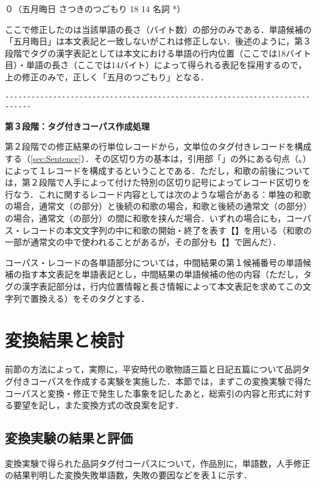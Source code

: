 ０（五月晦日 さつきのつごもり 18 14 名詞 *）

ここで修正したのは当該単語の長さ（バイト数）の部分のみである．単語候補の「五月晦日」は本文表記と一致しないがこれは修正しない．後述のように，第３段階でタグの漢字表記としては本文における単語の行内位置（ここでは18バイト目）・単語の長さ（ここでは14バイト）によって得られる表記を採用するので，上の修正のみで，正しく「五月のつごもり」となる．

\begin{verbatim}
----------------------------------------------------------------------------
\end{verbatim}

\noindent
{\bf 第３段階：タグ付きコーパス作成処理}

第２段階での修正結果の行単位レコードから，文単位のタグ付きレコードを構成する（\ref{sec:Sentence}）．その区切り方の基本は，引用部「」の外にある句点（。）によって１レコードを構成するということである．ただし，和歌の前後については，第２段階で人手によって付けた特別の区切り記号によってレコード区切りを行なう．これに関するレコード内容としては次のような場合がある：単独の和歌の場合，通常文（の部分）と後続の和歌の場合，和歌と後続の通常文（の部分）の場合，通常文（の部分）の間に和歌を挟んだ場合．いずれの場合にも，コーパス・レコードの本文文字列の中に和歌の開始・終了を表す【】を用いる（和歌の一部が通常文の中で使われることがあるが，その部分も【】で囲んだ）．

コーパス・レコードの各単語部分については，中間結果の第１候補番号の単語候補の指す本文表記を単語表記とし，中間結果の単語候補の他の内容（ただし，タグの漢字表記部分は，行内位置情報と長さ情報によって本文表記を求めてこの文字列で置換える）をそのタグとする．

\section{変換結果と検討}
\label{sec:result＆}

前節の方法によって，実際に，平安時代の歌物語三篇\cite{UTA1994}と日記五篇\cite{NIKKI1996}について品詞タグ付きコーパスを作成する実験を実施した．本節では，まずこの変換実験で得たコーパスと変換・修正で発生した事象を記したあと，総索引の内容と形式に対する要望を記し，また変換方式の改良案を記す．

\subsection{変換実験の結果と評価}
\label{sec:Exp}

変換実験で得られた品詞タグ付コーパスについて，作品別に，単語数，人手修正の結果判明した変換失敗単語数，失敗の要因などを表１に示す．

